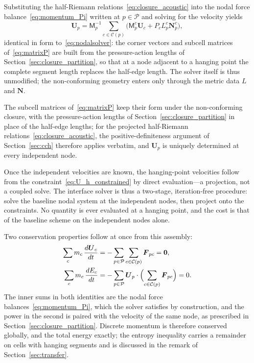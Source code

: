 \documentclass[a4paper]{cas-sc}
\begin{document}
Substituting the half-Riemann relations~\eqref{eq:closure_acoustic} into the nodal force balance~\eqref{eq:momentum_Pi} written at $p\in\mathcal P$ and solving for the velocity yields
\begin{equation}
 \boldsymbol U_p=\mathsf M_p^{-1}\sum_{c\in\mathcal C(p)}
 \bigl(\mathsf M_p^c\boldsymbol U_c+P_cL_p^c\boldsymbol N_p^c\bigr),
 \label{eq:closure_solver}
\end{equation}
identical in form to~\eqref{eq:nodalsolver}: the corner vectors and subcell matrices of~\eqref{eq:matrixP} are built from the pressure-action lengths of Section~\ref{sec:closure_partition}, so that at a node adjacent to a hanging point the complete segment length replaces the half-edge length. The solver itself is thus unmodified; the non-conforming geometry enters only through the metric data $L$ and $\boldsymbol N$.

The subcell matrices of~\eqref{eq:matrixP} keep their form under the non-conforming closure, with the pressure-action lengths of Section~\ref{sec:closure_partition} in place of the half-edge lengths; for the projected half-Riemann relations~\eqref{eq:closure_acoustic}, the positive-definiteness argument of Section~\ref{sec:cch} therefore applies verbatim, and $\boldsymbol U_p$ is uniquely determined at every independent node.

Once the independent velocities are known, the hanging-point velocities follow from the constraint~\eqref{eq:U_h_constrained} by direct evaluation---a projection, not a coupled solve. The interface solver is thus a two-stage, iteration-free procedure: solve the baseline nodal system at the independent nodes, then project onto the constraints. No quantity is ever evaluated at a hanging point, and the cost is that of the baseline scheme on the independent nodes alone.

Two conservation properties follow at once from this assembly:
\begin{subequations}
\begin{align}
	\sum_c m_c\,\frac{d\boldsymbol U_c}{dt}
	&=-\sum_{p\in\mathcal P}\sum_{c\in\mathcal C(p)}\boldsymbol F_{pc}=\boldsymbol 0,
	\label{eq:closure_mom}\\
	\sum_c m_c\,\frac{dE_c}{dt}
	&=-\sum_{p\in\mathcal P}\boldsymbol U_p\cdot\Bigl(\sum_{c\in\mathcal C(p)}\boldsymbol F_{pc}\Bigr)=0.
	\label{eq:closure_energy}
\end{align}
\label{eq:closure_conservation}
\end{subequations}
The inner sums in both identities are the nodal force balances~\eqref{eq:momentum_Pi}, which the solver satisfies by construction, and the power in the second is paired with the velocity of the same node, as prescribed in Section~\ref{sec:closure_partition}. Discrete momentum is therefore conserved globally, and the total energy exactly; the entropy inequality carries a remainder on cells with hanging segments and is discussed in the remark of Section~\ref{sec:transfer}.
\end{document}
